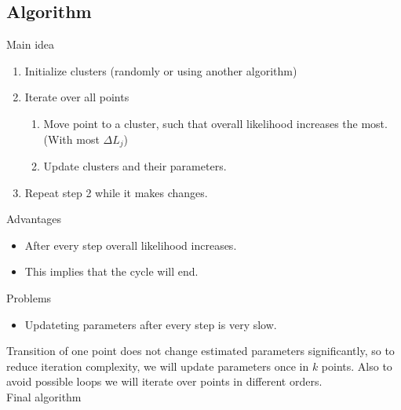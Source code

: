 \documentclass[a4paper, 12pt]{article}
\theoremstyle{definition}
\theoremstyle{definition}
\theoremstyle{remark}
\begin{document}
\subsection{Algorithm}
Main idea
\begin{enumerate}
    \item Initialize clusters (randomly or using another algorithm)
    \item Iterate over all points
    \begin{enumerate}
        \item Move point to a cluster, such that overall likelihood increases the most. (With most $\Delta L_j$)
        \item Update clusters and their parameters.
    \end{enumerate}
    \item Repeat step 2 while it makes changes.
\end{enumerate}
Advantages
\begin{itemize}
    \item After every step overall likelihood increases.
    \item This implies that the cycle will end.
\end{itemize}
Problems
\begin{itemize}
    \item Updateting parameters after every step is very slow.
\end{itemize}
Transition of one point does not change estimated parameters significantly, 
so to reduce iteration complexity, we will update parameters once in $k$ points. 
Also to avoid possible loops we will iterate over points in different orders. \\
Final algorithm
\end{document}
